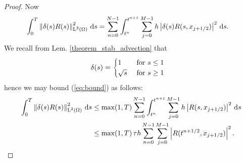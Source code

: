 \documentclass[final]{amsart}
\renewcommand{\d}{\ensuremath{\,\mathrm{d}}}
\numberwithin{equation}{section}
\begin{document}
\begin{proof}
	Now
	\begin{equation}\label{eq:bound}
	\begin{split}
	\int_0^T \Norm{\delta(s) R(s)}_{\leb{2}(\W)}^2 \d s
	&=
	\sum_{n=0}^{N-1} \int_{t^n}^{t^{n+1}}
	\sum_{j=0}^{M-1} h \norm{\delta(s) R(s, x_{j+1/2})}^2 \d s
	.
	\end{split}
	\end{equation}
	We recall from Lem.  \ref{theorem_stab_advection} that 
	\begin{equation}
	\begin{aligned}
	\delta\!\left({s}\right)&=\begin{cases}
	1 &\text{ for } s\leq 1\\
	\sqrt{s} &\text{ for } s\geq 1\\
	\end{cases}
	\end{aligned}
	\end{equation}
	hence we may bound (\ref{eq:bound}) as follows:
	\begin{equation}\label{eq:bound_2   }
	\begin{split}
	\int_0^T \Norm{\delta(s) R(s)}_{\leb{2}(\W)}^2 \d s
	&\leq
	\max\qp{1,{T}}
	\sum_{n=0}^{N-1} \int_{t^n}^{t^{n+1}}
	\sum_{j=0}^{M-1} h \norm{R(s, x_{j+1/2})}^2 \d s
	\\
	&\leq
	\max\qp{1,{T}}\tau h \sum_{n=0}^{N-1}
	\sum_{j=0}^{M-1} \norm{R(t^{n+1/2}, x_{j+1/2})}^2
	.
	\end{split}
	\end{equation}
	

\end{proof}
\end{document}
